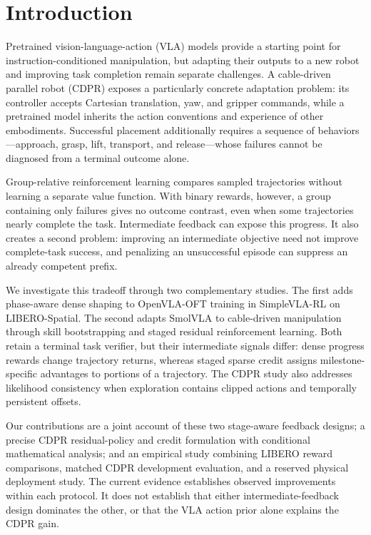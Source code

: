 \section{Introduction}\label{sec:introduction}
Pretrained vision-language-action (VLA) models provide a starting point for instruction-conditioned manipulation, but adapting their outputs to a new robot and improving task completion remain separate challenges. A cable-driven parallel robot (CDPR) exposes a particularly concrete adaptation problem: its controller accepts Cartesian translation, yaw, and gripper commands, while a pretrained model inherits the action conventions and experience of other embodiments. Successful placement additionally requires a sequence of behaviors---approach, grasp, lift, transport, and release---whose failures cannot be diagnosed from a terminal outcome alone.

Group-relative reinforcement learning compares sampled trajectories without learning a separate value function. With binary rewards, however, a group containing only failures gives no outcome contrast, even when some trajectories nearly complete the task. Intermediate feedback can expose this progress. It also creates a second problem: improving an intermediate objective need not improve complete-task success, and penalizing an unsuccessful episode can suppress an already competent prefix.

We investigate this tradeoff through two complementary studies. The first adds phase-aware dense shaping to OpenVLA-OFT training in SimpleVLA-RL on LIBERO-Spatial. The second adapts SmolVLA to cable-driven manipulation through skill bootstrapping and staged residual reinforcement learning. Both retain a terminal task verifier, but their intermediate signals differ: dense progress rewards change trajectory returns, whereas staged sparse credit assigns milestone-specific advantages to portions of a trajectory. The CDPR study also addresses likelihood consistency when exploration contains clipped actions and temporally persistent offsets.

Our contributions are a joint account of these two stage-aware feedback designs; a precise CDPR residual-policy and credit formulation with conditional mathematical analysis; and an empirical study combining LIBERO reward comparisons, matched CDPR development evaluation, and a reserved physical deployment study. The current evidence establishes observed improvements within each protocol. It does not establish that either intermediate-feedback design dominates the other, or that the VLA action prior alone explains the CDPR gain.

